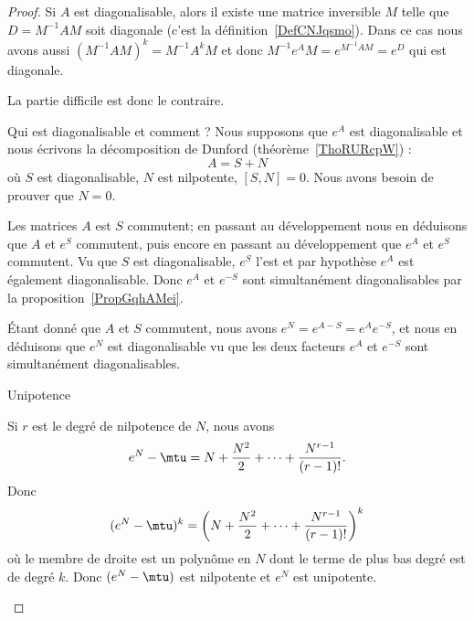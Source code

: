 \begin{proof}
    Si \( A\) est diagonalisable, alors il existe une matrice inversible \( M\) telle que \( D=M^{-1}AM\) soit diagonale (c'est la définition~\ref{DefCNJqsmo}). Dans ce cas nous avons aussi \( (M^{-1}AM)^k=M^{-1}A^kM\) et donc \( M^{-1}e^AM=e^{M^{-1}AM}=e^D\) qui est diagonale.

    La partie difficile est donc le contraire.

    \begin{subproof}
        \item[Qui est diagonalisable et comment ?]
            Nous supposons que \( e^A\) est diagonalisable et nous écrivons la décomposition de Dunford (théorème~\ref{ThoRURcpW}) :
            \begin{equation}
                A=S+N
            \end{equation}
            où \( S\) est diagonalisable, \( N\) est nilpotente, \( [S,N]=0\). Nous avons besoin de prouver que \( N=0\).

            Les matrices \( A\) est \( S\) commutent; en passant au développement nous en déduisons que \( A\) et \( e^S\) commutent, puis encore en passant au développement que \( e^A\) et \( e^S\) commutent. Vu que \( S\) est diagonalisable, \( e^S\) l'est et par hypothèse \( e^A\) est également diagonalisable. Donc \( e^A\) et \( e^{-S}\) sont simultanément diagonalisables par la proposition~\ref{PropGqhAMei}.

            Étant donné que \( A\) et \( S\) commutent, nous avons \( e^N=e^{A-S}=e^Ae^{-S}\), et nous en déduisons que \( e^N\) est diagonalisable vu que les deux facteurs \( e^A\) et \( e^{-S}\) sont simultanément diagonalisables.

        \item[Unipotence]

            Si \( r\) est le degré de nilpotence de \( N\), nous avons
            \begin{equation}    \label{EqQHjvLZQ}
                e^N-\mtu=N+\frac{ N^2 }{2}+\cdots +\frac{ N^{r-1} }{ (r-1)! }.
            \end{equation}
            Donc
            \begin{equation}
                (e^N-\mtu)^k=\left( N+\frac{ N^2 }{2}+\cdots +\frac{ N^{r-1} }{ (r-1)! } \right)^k
            \end{equation}
            où le membre de droite est un polynôme en \( N\) dont le terme de plus bas degré est de degré \( k\). Donc \( (e^N-\mtu)\) est nilpotente et \( e^N\) est unipotente.


\end{subproof}
\end{proof}
